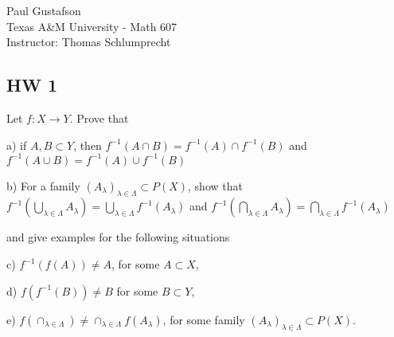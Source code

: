 \documentclass{article}
\begin{document}
\noindent Paul Gustafson\\
\noindent Texas A\&M University - Math 607\\ 
\noindent Instructor: Thomas Schlumprecht

\subsection*{HW 1}
 Let $f: X \to Y$. Prove that 

 a) if $A,B \subset Y$, then $f^{-1}(A \cap B) = f^{-1}(A) \cap f^{-1}(B)$ and
$f^{-1}(A \cup B) = f^{-1}(A) \cup f^{-1}(B)$

b) For a family $(A_\lambda)_{\lambda \in \Lambda} \subset P(X)$,  show that
$f^{-1}(\bigcup_{\lambda \in \Lambda} A_\lambda) = \bigcup_{\lambda \in \Lambda} f^{-1}(A_\lambda)$ and $f^{-1}(\bigcap_{\lambda \in \Lambda} A_\lambda) = \bigcap_{\lambda \in \Lambda} f^{-1}(A_\lambda)$

 and give examples for the following situations

c) $f^{-1}(f(A)) \neq A$, for some $A \subset X$,

d) $f(f^{-1}(B)) \neq B$ for some $B \subset Y$,

e) $f(\cap_{\lambda \in \Lambda}) \neq \cap_{\lambda \in \Lambda} f(A_\lambda)$, for some family $(A_\lambda)_{\lambda \in \Lambda} \subset P(X)$.
\end{document}
